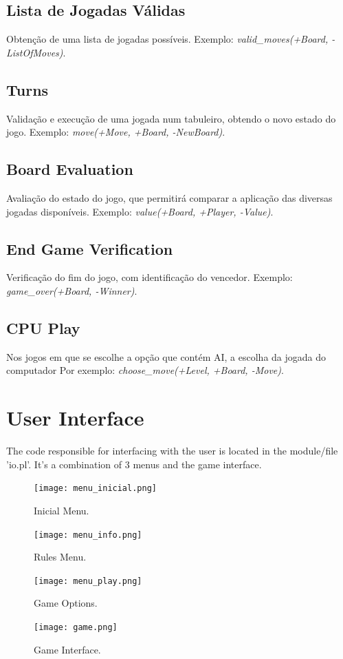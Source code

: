 \documentclass[a4paper]{article}
\begin{document}
\subsection{Lista de Jogadas Válidas} Obtenção de uma lista de jogadas possíveis. Exemplo: \textit{valid\_moves(+Board, -ListOfMoves)}.

\subsection{Turns} Validação e execução de uma jogada num tabuleiro, obtendo o novo estado do jogo. Exemplo: \textit{move(+Move, +Board, -NewBoard)}.

\subsection{Board Evaluation} Avaliação do estado do jogo, que permitirá comparar a aplicação das diversas jogadas disponíveis. Exemplo: \textit{value(+Board, +Player, -Value)}.

\subsection{End Game Verification} Verificação do fim do jogo, com identificação do vencedor. Exemplo: \textit{game\_over(+Board, -Winner)}.

\subsection{CPU Play}
    Nos jogos em que se escolhe a opção que contém AI, a escolha da jogada do computador  Por exemplo: \textit{choose\_move(+Level, +Board, -Move)}.


\section{User Interface}

The code responsible for interfacing with the user is located in the module/file 'io.pl'.
It's a combination of 3 menus and the game interface.

\begin{figure}[!h]
\centering
{}
  \texttt{[image: menu\_inicial.png]}
  \caption{Inicial Menu.}\label{fig:menu_inicial}
\endminipage
{}
  \texttt{[image: menu\_info.png]}
  \caption{Rules Menu.}\label{fig:menu_info}
\endminipage
{}%
  \texttt{[image: menu\_play.png]}
  \caption{Game Options.}\label{fig:menu_play}
\endminipage\hfill

%
    \vspace{0.7cm}
  \texttt{[image: game.png]}
  \caption{Game Interface.}\label{fig:game}
\endminipage\hfill

\end{figure}
\end{document}
